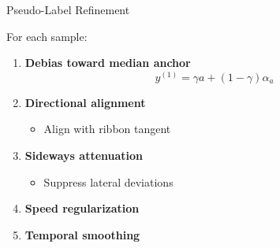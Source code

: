 \begin{frame}{Pseudo-Label Refinement}

    For each sample:

    \vspace{0.5em}

    \begin{enumerate}
        \item \textbf{Debias toward median anchor}
            \[
                y^{(1)}
                =
                \gamma a
                +(1-\gamma)\alpha_a
            \]

            \vspace{0.5em}

        \item \textbf{Directional alignment}
            \begin{itemize}
                \item Align with ribbon tangent
            \end{itemize}

            \vspace{0.5em}

        \item \textbf{Sideways attenuation}
            \begin{itemize}
                \item Suppress lateral deviations
            \end{itemize}

            \vspace{0.5em}

        \item \textbf{Speed regularization}

            \vspace{0.5em}

        \item \textbf{Temporal smoothing}
    \end{enumerate}

\end{frame}

